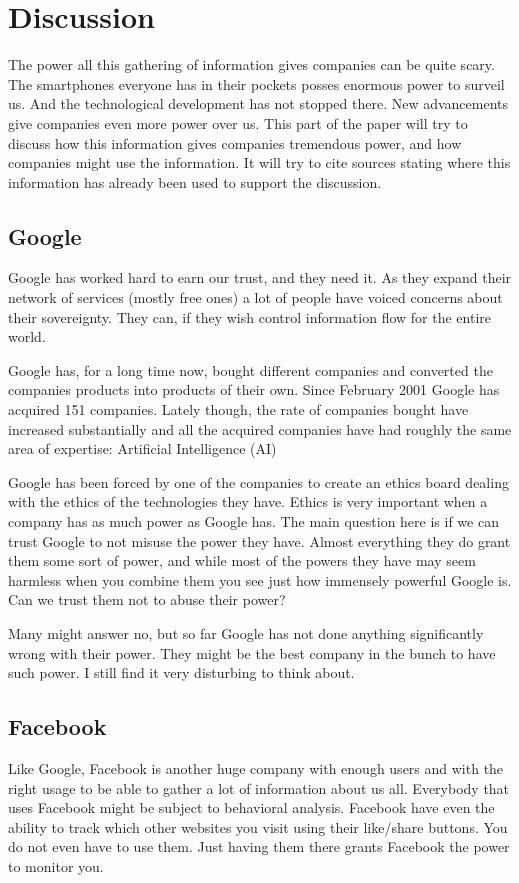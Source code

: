 \section{Discussion}
The power all this gathering of information gives companies can be quite scary. The smartphones everyone has in their pockets posses enormous power to surveil us. And the technological development has not stopped there. New advancements give companies even more power over us. This part of the paper will try to discuss how this information gives companies tremendous power, and how companies might use the information. It will try to cite sources stating where this information has already been used to support the discussion.

\subsection{Google}
Google has worked hard to earn our trust, and they need it. As they expand their network of services (mostly free ones) a lot of people have voiced concerns about their sovereignty. They can, if they wish control information flow for the entire world.

Google has, for a long time now, bought different companies and converted the companies products into products of their own. Since February 2001 Google has acquired 151 companies. Lately though, the rate of companies bought have increased substantially and all the acquired companies have had roughly the same area of expertise: Artificial Intelligence (AI)\cite{website:google-buys}

Google has been forced by one of the companies to create an ethics board dealing with the ethics of the technologies they have.\cite{website:google-ethics} Ethics is very important when a company has as much power as Google has. The main question here is if we can trust Google to not misuse the power they have. Almost everything they do grant them some sort of power, and while most of the powers they have may seem harmless when you combine them you see just how immensely powerful Google is. Can we trust them not to abuse their power?

Many might answer no, but so far Google has not done anything significantly wrong with their power. They might be the best company in the bunch to have such power. I still find it very disturbing to think about.

\subsection{Facebook}
Like Google, Facebook is another huge company with enough users and with the right usage to be able to gather a lot of information about us all. Everybody that uses Facebook might be subject to behavioral analysis. Facebook have even the ability to track which other websites you visit using their like/share buttons. You do not even have to use them. Just having them there grants Facebook the power to monitor you.\cite{website:facebook-tracking}

